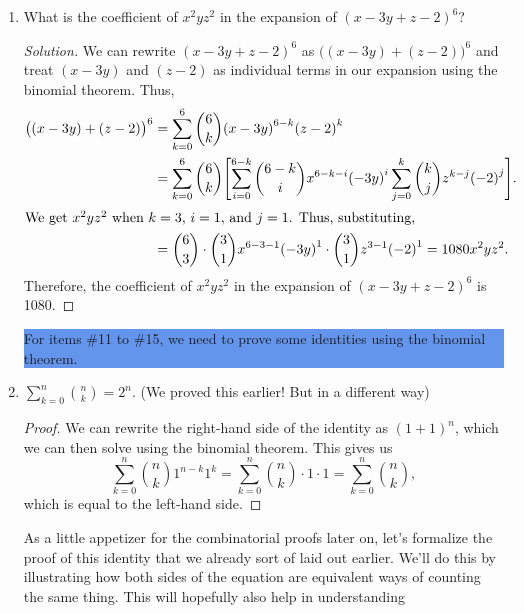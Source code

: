 \documentclass{article}
\newenvironment{solution}
  {\renewcommand\qedsymbol{$\blacksquare$}\begin{proof}[Solution]}
  {\end{proof}}
\begin{document}
\begin{enumerate}
\begin{solution}
\begin{align}
            &= \binom{5}{0} \cdot \binom{5}{3} x^{5-0-3} {(-y)}^3 \cdot 3^0 = -10x^2 y^3. \notag 
        \end{align} Therefore, the coefficient of $x^2 y^3$ in the expansion of ${(x-y+3)}^5$ is $-10$. 
    \end{solution} 
    \item What is the coefficient of $x^2 yz^2$ in the expansion of ${(x-3y+z-2)}^6$? \begin{solution} 
        We can rewrite ${(x-3y+z-2)}^6$ as ${\big( (x-3y) + (z-2) \big)}^6$ and treat $(x-3y)$ and $(z-2)$ as individual terms in our expansion using the binomial theorem. Thus,\begin{align}
            {\big( (x-3y) + (z-2) \big)}^6 &= \sum_{k=0}^6 \binom{6}{k} {(x-3y)}^{6-k} {(z-2)}^{k} \notag \\ 
            &= \sum_{k=0}^6 \binom{6}{k} \Biggl[ \sum_{i=0}^{6-k} \binom{6-k}{i} x^{6-k-i} {(-3y)}^i \sum_{j=0}^{k} \binom{k}{j} z^{k-j} {(-2)}^j \Biggr]. \notag \\
            \intertext{We get $x^2 yz^2$ when $k=3$, $i=1$, and $j=1$. Thus, substituting,}
            &= \binom{6}{3} \cdot \binom{3}{1} x^{6-3-1} {(-3y)}^1 \cdot \binom{3}{1} z^{3-1} {(-2)}^1 = 1080x^2 yz^2. \notag 
        \end{align} Therefore, the coefficient of $x^2 yz^2$ in the expansion of ${(x-3y+z-2)}^6$ is 1080. 
    \end{solution} 
    \colorbox{CornflowerBlue}{
    \begin{minipage}[c]{0.9\textwidth}
        \centering
        For items \#11 to \#15, we need to prove some identities using the binomial theorem.
    \end{minipage}%
    }%
    \item $\displaystyle \sum_{k=0}^{n} \binom{n}{k} = 2^n$. (We proved this earlier! But in a different way)\begin{proof} 
        We can rewrite the right-hand side of the identity as ${(1+1)}^n$, which we can then solve using the binomial theorem. This gives us\[
            \sum_{k=0}^n \binom{n}{k} 1^{n-k} 1^k = \sum_{k=0}^{n} \binom{n}{k} \cdot 1 \cdot 1 = \sum_{k=0}^{n} \binom{n}{k},
        \] which is equal to the left-hand side.
    \end{proof}
    As a little appetizer for the combinatorial proofs later on, let's formalize the proof of this identity that we already sort of laid out earlier.
    We'll do this by illustrating how both sides of the equation are equivalent ways of counting the same thing. This will hopefully also help in understanding 

\end{enumerate}
\end{document}

